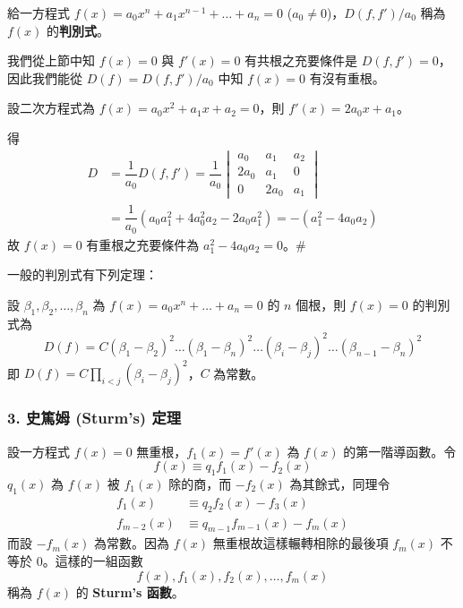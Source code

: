 \begin{definition}\label{def:b6s-app3-discriminant}
給一方程式 $f(x) = a_0 x^n + a_1 x^{n-1} + \dots + a_n = 0$ ($a_0 \ne 0$)，$D(f, f')/a_0$ 稱為 $f(x)$ 的\textbf{判別式}。
\end{definition}

我們從上節中知 $f(x)=0$ 與 $f'(x)=0$ 有共根之充要條件是 $D(f, f') = 0$，因此我們能從 $D(f) = D(f, f')/a_0$ 中知 $f(x)=0$ 有沒有重根。

\begin{example}\label{ex:b6s-app3-2}
設二次方程式為 $f(x)=a_0 x^2 + a_1 x + a_2 = 0$，則 $f'(x)=2a_0 x + a_1$。
\end{example}

得
\begin{align*}
D &= \dfrac{1}{a_0} D(f, f') = \dfrac{1}{a_0} \begin{vmatrix}
a_0 & a_1 & a_2 \\
2a_0 & a_1 & 0 \\
0 & 2a_0 & a_1
\end{vmatrix} \\
&= \dfrac{1}{a_0}(a_0 a_1^2 + 4a_0^2 a_2 - 2a_0 a_1^2) = -(a_1^2 - 4a_0 a_2)
\end{align*}
故 $f(x)=0$ 有重根之充要條件為 $a_1^2 - 4a_0 a_2 = 0$。\hfill$\#$

一般的判別式有下列定理：

\begin{theorem}\label{thm:b6s-app3-disc-roots}
設 $\beta_1, \beta_2, \dots, \beta_n$ 為 $f(x) = a_0 x^n + \dots + a_n = 0$ 的 $n$ 個根，則 $f(x)=0$ 的判別式為
\[ D(f) = C(\beta_1-\beta_2)^2 \dots (\beta_1-\beta_n)^2 \dots (\beta_i-\beta_j)^2 \dots (\beta_{n-1}-\beta_n)^2 \]
即 $D(f) = C \prod_{i<j} (\beta_i-\beta_j)^2$，$C$ 為常數。
\end{theorem}

\subsubsection*{3. 史篤姆 (Sturm's) 定理}\label{subsec:b6s-app3-3}

設一方程式 $f(x)=0$ 無重根，$f_1(x)=f'(x)$ 為 $f(x)$ 的第一階導函數。令
\begin{equation}
f(x) \equiv q_1 f_1(x) - f_2(x) \label{eq:b6s-app3-sturm-1}
\end{equation}
$q_1(x)$ 為 $f(x)$ 被 $f_1(x)$ 除的商，而 $-f_2(x)$ 為其餘式，同理令
\begin{align}
f_1(x) &\equiv q_2 f_2(x) - f_3(x) \label{eq:b6s-app3-sturm-2} \\
f_{m-2}(x) &\equiv q_{m-1} f_{m-1}(x) - f_m(x) \label{eq:b6s-app3-sturm-3}
\end{align}
而設 $-f_m(x)$ 為常數。因為 $f(x)$ 無重根故這樣輾轉相除的最後項 $f_m(x)$ 不等於 0。這樣的一組函數
\[ f(x), f_1(x), f_2(x), \dots, f_m(x) \]
稱為 $f(x)$ 的 \textbf{Sturm's 函數}。

